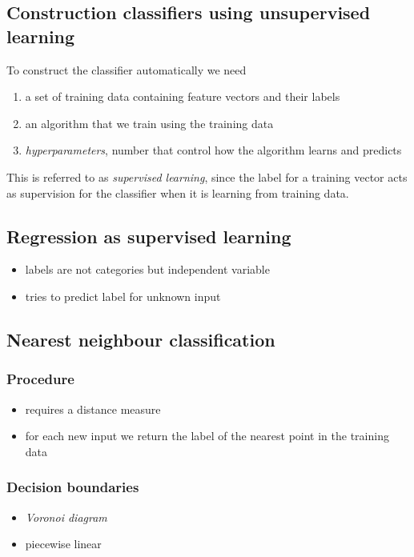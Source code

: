 \documentclass{article}
\begin{document}
\subsection{Construction classifiers using unsupervised learning}


To construct the classifier automatically we need
\begin{enumerate}
	\item a set of training data containing feature vectors and their labels
	\item an algorithm that we train using the training data
	\item \emph{hyperparameters}, number that control how the algorithm learns and predicts
\end{enumerate}
This is referred to as \emph{supervised learning}, since the label for a training
vector acts as supervision for the classifier when it is learning from
training data.


\subsection{Regression as supervised learning}


\begin{itemize}
	\item labels are not categories but independent variable
	\item tries to predict label for unknown input
\end{itemize}


\subsection{Nearest neighbour classification}


\subsubsection{Procedure}

\begin{itemize}
	\item requires a distance measure
	\item for each new input we return the label of the nearest point in the training data
\end{itemize}

\subsubsection{Decision boundaries}
\begin{itemize}
	\item \emph{Voronoi diagram}
	\item piecewise linear
\end{itemize}
\end{document}
